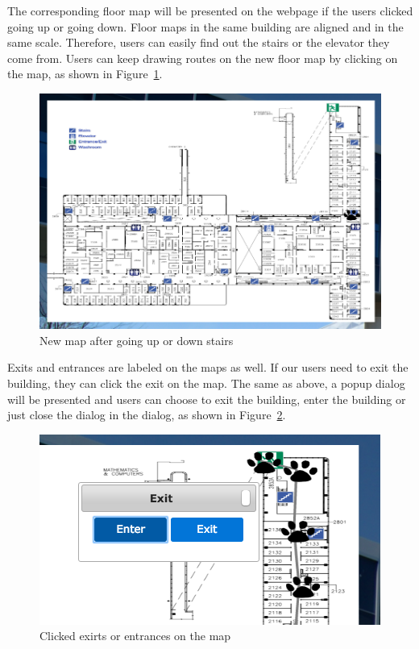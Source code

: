 \documentclass{sigchi}
\begin{document}
The corresponding floor map will be presented on the webpage if the users clicked going up or going down. Floor maps in the same building are aligned and in the same scale. Therefore, users can easily find out the stairs or the elevator they come from. Users can keep drawing routes on the new floor map by clicking on the map, as shown in Figure~\ref{fig:map3}.

\begin{figure}[!h]
\centering
\includegraphics[width=1.0\columnwidth]{pics/map3.png}
\caption{New map after going up or down stairs}
\label{fig:map3}
\end{figure}

Exits and entrances are labeled on the maps as well. If our users need to exit the building, they can click the exit on the map. The same as above, a popup dialog will be presented and users can choose to exit the building, enter the building or just close the dialog in the dialog, as shown in Figure~\ref{fig:map4}.


\begin{figure}[!h]
\centering
\includegraphics[width=1.0\columnwidth]{pics/map4.png}
\caption{Clicked exirts or entrances on the map}
\label{fig:map4}
\end{figure}
\end{document}
